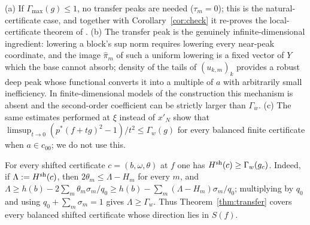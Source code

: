 \begin{remark}\label{rem:transfer}
(a) If $\Gamma_{\max}(g)\le1$, no transfer peaks are needed ($\tau_m=0$);
this is the natural-certificate case, and together with
Corollary~\ref{cor:check} it re-proves the local-certificate theorem of
\cite{Check}.  (b) The transfer peak is the genuinely infinite-dimensional
ingredient: lowering a block's sup norm requires lowering every near-peak
coordinate, and the image $\hat\pi_m$ of such a uniform lowering is a fixed
vector of $Y$ which the base cannot absorb; density of the tails of
$(u_{k,m})_k$ provides a robust deep peak whose functional converts it into
a multiple of $a$ with arbitrarily small inefficiency.  In finite-dimensional
models of the construction this mechanism is absent and the second-order
coefficient can be strictly larger than $\Gamma_w$.  (c) The same estimates
performed at $\xi$ instead of $x'_N$ show that
$\limsup_{t\to0}(p^*(f+tg)^2-1)/t^2\le\Gamma_w(g)$ for every balanced finite
certificate when $a\in c_{00}$; we do not use this.
\end{remark}

\begin{remark}\label{rem:gammaw}
For every shifted certificate $c=(b,\omega,\theta)$ at $f$ one has
$H^{\rm sh}(c)\ge\Gamma_w(g_c)$.  Indeed, if $\Lambda:=H^{\rm sh}(c)$, then
$2\theta_m\le\Lambda-H_m$ for every $m$, and
$\Lambda\ge h(b)-2\sum_m\theta_m\sigma_m/q_0\ge h(b)-\sum_m(\Lambda-H_m)
\sigma_m/q_0$; multiplying by $q_0$ and using $q_0+\sum_m\sigma_m=1$ gives
$\Lambda\ge\Gamma_w$.  Thus Theorem~\ref{thm:transfer} covers every
balanced shifted certificate whose direction lies in $S(f)$.
\end{remark}

